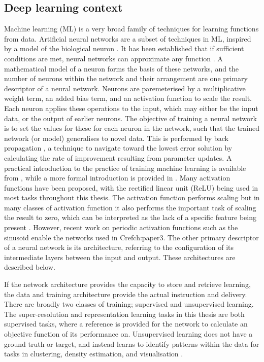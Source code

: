 \documentclass[manuscript.tex]{subfiles}
\begin{document}
\subsection{Deep learning context}
\label{sec:introml}
Machine learning (ML) is a very broad family of techniques for learning functions from data.
Artificial neural networks are a subset of techniques in ML, inspired by a model of the biological neuron \parencite{bishopNeuralNetworksPattern1995}.
It has been established that if sufficient conditions are met, neural networks can approximate any function \parencite{hornikMultilayerFeedforwardNetworks1989}.
A mathematical model of a neuron forms the basis of these networks, and the number of neurons within the network and their arrangement are one primary descriptor of a neural network. 
Neurons are paremeterised by a multiplicative weight term, an added bias term, and an activation function to scale the result.
Each neuron applies these operations to the input, which may either be the input data, or the output of earlier neurons.
The objective of training a neural network is to set the values for these for each neuron in the network, such that the trained network (or model) generalises to novel data.
This is performed by back propagation \parencite{rumelhartLearningRepresentationsBackpropagating1988}, a technique to navigate toward the lowest error solution by calculating the rate of improvement resulting from parameter updates.
A practical introduction to the practice of training machine learning is available from \textcite{stevensDeepLearningPyTorch2020}, while a more formal introduction is provided in \textcite{bishopPatternRecognitionMachine2006}.
Many activation functions have been proposed, with the rectified linear unit (ReLU) being used in most tasks throughout this thesis.
The activation function performs scaling but in many classes of activation function it also performs the important task of scaling the result to zero, which can be interpreted as the lack of a specific feature being present \parencite{williamsLogicActivationFunctions1986}.
However, recent work on periodic activation functions such as the sinusoid \parencite{sitzmann2019siren} enable the networks used in Cref{ch:paper3}.
The other primary descriptor of a neural network is its architecture, referring to the configuration of its intermediate layers between the input and output.
These architectures are described below.

If the network architecture provides the capacity to store and retrieve learning, the data and training architecture provide the actual instruction and delivery.
There are broadly two classes of training; supervised and unsupervised learning. 
The super-resolution and representation learning tasks in this thesis are both supervised tasks, where a reference is provided for the network to calculate an objective function of its performance on.
Unsupervised learning does not have a ground truth or target, and instead learns to identify patterns within the data for tasks in clustering, density estimation, and visualisation \parencite{bishopPatternRecognitionMachine2006}.
\end{document}
